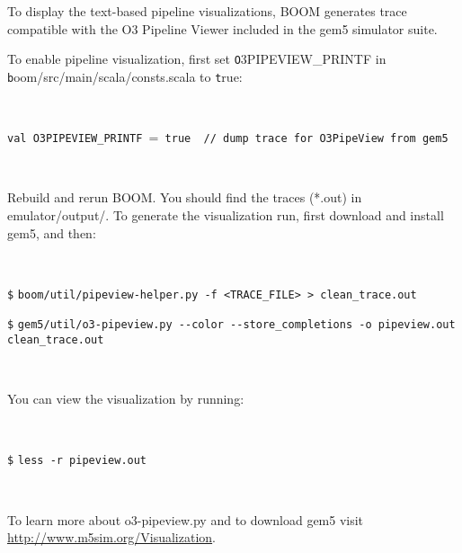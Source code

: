 To display the text-based pipeline visualizations, BOOM generates trace compatible with the O3 Pipeline Viewer included in the gem5 simulator suite.\cite{gem5} 

To enable pipeline visualization, first set {\texttt O3PIPEVIEW\_PRINTF} in {\texttt boom/src/main/scala/consts.scala} to {\texttt true}:

\

\verb=val O3PIPEVIEW_PRINTF ==\verb= true  // dump trace for O3PipeView from gem5=

\

Rebuild and rerun BOOM. You should find the traces (*.out) in emulator/output/. To generate the visualization run, first download and install gem5\cite{gem5}, and then:

\

\texttt{\$} \verb=boom/util/pipeview-helper.py -f <TRACE_FILE> > clean_trace.out=

\texttt{\$} \verb=gem5/util/o3-pipeview.py --color --store_completions -o pipeview.out clean_trace.out=

\

You can view the visualization by running:

\

\texttt{\$} \verb=less -r pipeview.out=

\

To learn more about o3-pipeview.py and to download gem5 visit \url{http://www.m5sim.org/Visualization}.





